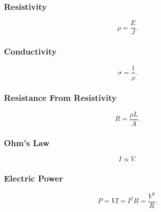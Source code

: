 \subsubsection{Resistivity}
\begin{equation*}
  \rho = \frac{E}{J}
.\end{equation*}

\begin{symbols}
\end{symbols}

\subsubsection{Conductivity}
\begin{equation*}
  \sigma = \frac{1}{\rho}
.\end{equation*}
\begin{symbols}
\end{symbols}

\subsubsection{Resistance From Resistivity}
\begin{equation*}
  R = \frac{\rho L}{A}
.\end{equation*}

\begin{symbols}
\end{symbols}

\subsubsection{Ohm's Law}
\begin{equation*}
  I \propto V
.\end{equation*}

\begin{symbols}
\end{symbols}

\subsubsection{Electric Power}
\begin{equation*}
  P = VI = I^2 R = \frac{V^2}{R}
.\end{equation*}

\begin{symbols}
\end{symbols}


